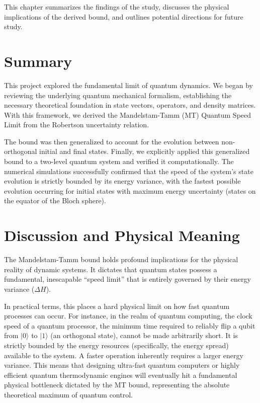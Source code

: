 This chapter summarizes the findings of the study, discusses the physical implications of the derived bound, and outlines potential directions for future study.

\section{Summary}
This project explored the fundamental limit of quantum dynamics. We began by reviewing the underlying quantum mechanical formalism, establishing the necessary theoretical foundation in state vectors, operators, and density matrices. With this framework, we derived the Mandelstam-Tamm (MT) Quantum Speed Limit from the Robertson uncertainty relation. 

The bound was then generalized to account for the evolution between non-orthogonal initial and final states. Finally, we explicitly applied this generalized bound to a two-level quantum system and verified it computationally. The numerical simulations successfully confirmed that the speed of the system's state evolution is strictly bounded by its energy variance, with the fastest possible evolution occurring for initial states with maximum energy uncertainty (states on the equator of the Bloch sphere).

\section{Discussion and Physical Meaning}
The Mandelstam-Tamm bound holds profound implications for the physical reality of dynamic systems. It dictates that quantum states possess a fundamental, inescapable ``speed limit'' that is entirely governed by their energy variance ($\Delta H$). 

In practical terms, this places a hard physical limit on how fast quantum processes can occur. For instance, in the realm of quantum computing, the clock speed of a quantum processor, the minimum time required to reliably flip a qubit from $|0\rangle$ to $|1\rangle$ (an orthogonal state), cannot be made arbitrarily short. It is strictly bounded by the energy resources (specifically, the energy spread) available to the system. A faster operation inherently requires a larger energy variance. This means that designing ultra-fast quantum computers or highly efficient quantum thermodynamic engines will eventually hit a fundamental physical bottleneck dictated by the MT bound, representing the absolute theoretical maximum of quantum control.

